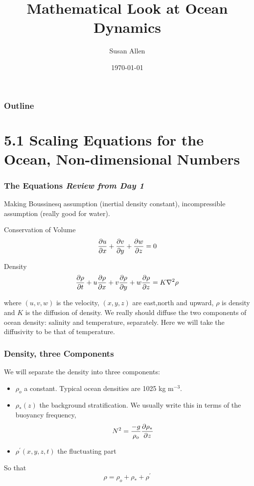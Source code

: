 \documentclass[xcolor=dvipsnames]{beamer}
\title{Mathematical Look at Ocean Dynamics}    %
\author{Susan Allen}                 %
\institute{UBC}      %
\date{\today}                    %
\begin{document}
\begin{frame}
  \titlepage
\end{frame}

\begin{frame}
\frametitle{Outline}
  \tableofcontents
\end{frame}


\section{5.1 Scaling Equations for the Ocean, Non-dimensional Numbers}

\begin{frame}
  \frametitle{The Equations {\it Review from Day 1}}   %

Making Boussinesq assumption (inertial density constant), incompressible assumption (really good for water).

Conservation of Volume\\
\[ \frac {\partial u}{\partial x} + \frac {\partial v}{\partial y} + \frac {\partial w}{\partial z} = 0 \]

Density\\
\[ \frac {\partial \rho}{\partial t} + u \frac {\partial \rho}{\partial x} + v \frac {\partial \rho}{\partial y} + w \frac {\partial \rho}{\partial z} = K \nabla^2 \rho \]

where $(u,v,w)$ is the velocity, $(x,y,z)$ are east,north and upward, $\rho$ is density and $K$ is the diffusion of density.  We really should diffuse the two components of ocean density: salinity and temperature, separately.  Here we will take the diffusivity to be that of temperature.

\end{frame}

\begin{frame}
\frametitle{Density, three Components}

We will separate the density into three components:
\begin{itemize}
\item $\rho_o$ a constant.  Typical ocean densities are 1025 kg m$^{-3}$. 
\item $\rho_*(z)$ the background stratification.  We usually write this in terms of the buoyancy frequency, \[ N^2 = \frac{-g}{\rho_o} \frac{\partial \rho_*}{\partial z} \]
\item $\rho^{\prime}(x,y,z,t)$ the fluctuating part
\end{itemize}
So that
\[ \rho = \rho_o + \rho_* + \rho^{\prime} \]
\end{frame}
\end{document}
